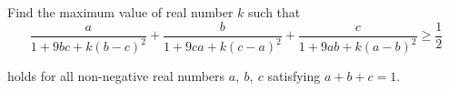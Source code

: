 Find the maximum value of real number $k$ such that\[\frac{a}{1+9bc+k(b-c)^2}+\frac{b}{1+9ca+k(c-a)^2}+\frac{c}{1+9ab+k(a-b)^2}\geq \frac{1}{2}\]

holds for all non-negative real numbers $a,\ b,\ c$ satisfying $a+b+c=1$.